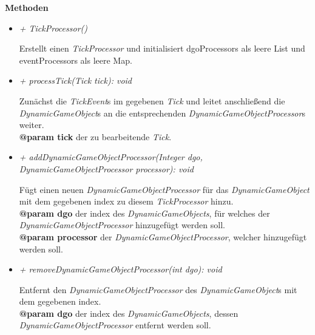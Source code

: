             \textbf{Methoden}
            \begin{itemize}
                \item  \textit{+ TickProcessor()}
                    \begin{leftbar}[0.9\linewidth]
                        Erstellt einen \textit{TickProcessor} und initialisiert dgoProcessors als leere List und eventProcessors als leere Map.
                    \end{leftbar}

                \pagebreak
                \item \textit{+ processTick(Tick tick): void}
                    \begin{leftbar}[0.9\linewidth]
                        Zunächst die \textit{TickEvent}s im gegebenen \textit{Tick} und leitet anschließend die \textit{DynamicGameObject}s
                        an die entsprechenden \textit{DynamicGameObjectProcessor}s weiter.\\
                        \textbf{@param tick} der zu bearbeitende \textit{Tick}.
                    \end{leftbar}
                \item \textit{+ addDynamicGameObjectProcessor(Integer dgo, DynamicGameObjectProcessor processor): void}
                    \begin{leftbar}[0.9\linewidth]
                        Fügt einen neuen \textit{DynamicGameObjectProcessor} für das \textit{DynamicGameObject} mit dem gegebenen index
                        zu diesem \textit{TickProcessor} hinzu.\\
                        \textbf{@param dgo} der index des \textit{DynamicGameObjects}, für welches der \textit{DynamicGameObjectProcessor} hinzugefügt werden soll.\\
                        \textbf{@param processor} der \textit{DynamicGameObjectProcessor}, welcher hinzugefügt werden soll.
                    \end{leftbar}
                \item \textit{+ removeDynamicGameObjectProcessor(int dgo): void}
                    \begin{leftbar}[0.9\linewidth]
                        Entfernt den \textit{DynamicGameObjectProcessor} des \textit{DynamicGameObject}s mit dem gegebenen index.\\
                        \textbf{@param dgo} der index des \textit{DynamicGameObjects}, dessen \textit{DynamicGameObjectProcessor} entfernt werden soll.

\end{leftbar}
\end{itemize}
